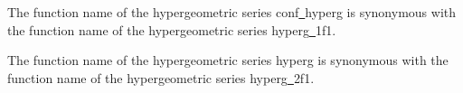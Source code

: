 \vspace{6.0pt}

 The function name of the hyper\-geometric series
{\courier conf\underline\ hyperg} is synonymous with the function name of
the hyper\-geometric series {\courier hyperg\underline\ 1f1}.

\vspace{6.0pt}

 The function name of the hyper\-geometric series
{\courier hyperg} is synonymous with the function name of the hyper\-geometric
series {\courier hyperg\underline\ 2f1}.


